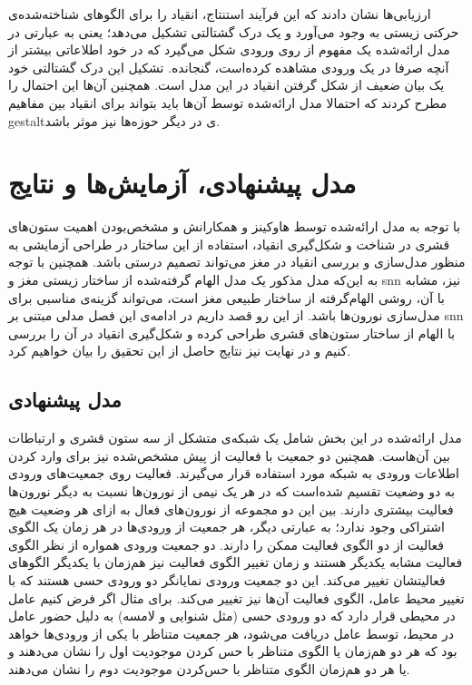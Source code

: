 \documentclass[12pt]{report}
\begin{document}
ارزیابی‌ها نشان دادند که این فرآیند استنتاج، انقیاد را برای الگو‌های شناخته‌شده‌ی حرکتی زیستی به وجود می‌آورد و یک درک گشتالتی  تشکیل می‌دهد؛ یعنی به عبارتی در مدل ارائه‌شده یک مفهوم از روی ورودی شکل می‌گیرد که در خود اطلاعاتی بیشتر از آنچه صرفا در یک ورودی مشاهده کرده‌است، گنجانده. تشکیل این درک گشتالتی خود یک بیان ضعیف از شکل گرفتن انقیاد در این مدل است.
	همچنین آن‌ها این احتمال را مطرح کردند که احتمالا مدل ارائه‌شده توسط آن‌ها باید بتواند برای انقیاد بین مفاهیم \gls{gestalt}ی در دیگر حوزه‌ها نیز موثر باشد.
	
	
	
	\chapter{مدل پیشنهادی، آزمایش‌ها و نتایج}
	
	با توجه به مدل ارائه‌شده توسط‌ هاوکینز و همکارانش و مشخص‌بودن اهمیت ستون‌های قشری در شناخت و شکل‌گیری انقیاد، استفاده از این ساختار در طراحی آزمایشی به منظور مدل‌سازی و بررسی انقیاد در مغز می‌تواند تصمیم درستی باشد. همچنین با توجه به این‌که مدل مذکور یک مدل الهام گرفته‌شده از ساختار زیستی مغز و \gls{snn} نیز، مشابه با آن، روشی الهام‌گرفته از ساختار طبیعی مغز است، می‌تواند گزینه‌ی مناسبی برای مدل‌سازی نورون‌ها باشد. از این رو قصد داریم در ادامه‌ی این فصل مدلی مبتنی بر \gls{snn} با الهام از ساختار ستون‌های قشری طراحی کرده و شکل‌گیری انقیاد در آن را بررسی کنیم و در نهایت نیز نتایج حاصل از این تحقیق را بیان خواهیم کرد.
	
	\section{مدل پیشنهادی}
	
	مدل ارائه‌شده در این بخش شامل یک شبکه‌ی متشکل از سه ستون قشری و ارتباطات بین آن‌هاست. همچنین دو جمعیت با فعالیت از پیش مشخص‌شده نیز برای وارد کردن اطلاعات ورودی به شبکه مورد استفاده قرار می‌گیرند. فعالیت روی جمعیت‌های ورودی به دو وضعیت تقسیم شده‌است که در هر یک نیمی از نورون‌ها نسبت به دیگر نورون‌ها فعالیت بیشتری دارند. بین این دو مجموعه از نورون‌های فعال به ازای هر وضعیت هیچ اشتراکی وجود ندارد؛ به عبارتی دیگر، هر جمعیت از ورودی‌ها در هر زمان یک الگوی فعالیت از دو الگوی فعالیت ممکن را دارند. دو جمعیت ورودی همواره از نظر الگوی فعالیت مشابه یکدیگر هستند و زمان تغییر الگوی فعالیت نیز هم‌زمان با یکدیگر الگو‌های فعالیتشان تغییر می‌کند. این دو جمعیت ورودی نمایانگر دو ورودی حسی هستند که با تغییر محیط عامل، الگوی فعالیت آن‌ها نیز تغییر می‌کند. برای مثال اگر فرض کنیم عامل در محیطی قرار دارد که دو ورودی حسی (مثل شنوایی و لامسه) به دلیل حضور عامل در محیط، توسط عامل دریافت می‌شود، هر جمعیت متناظر با یکی از ورودی‌ها خواهد بود که هر دو هم‌زمان یا الگوی متناظر با حس کردن موجودیت اول را نشان‌ می‌دهند و یا هر دو هم‌زمان الگوی متناظر با حس‌کردن موجودیت دوم را نشان می‌دهند.
	
\end{document}
